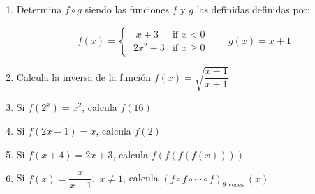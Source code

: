 {\begin{enumerate}[1).-  ]
		 	\begin{multicols}{2}
		 	\begin{enumerate}[a. ]
		 		\item $f(x)=\frac 3 x \; ;\quad g(x)=x^2-1$
		 		\item $f(x)= \frac 1 x\; ; \quad g(x)=\sqrt{x+2}$
		 	\end{enumerate}	
		 	\end{multicols}
			
			\rightline{\textcolor{gris}{Solución: b) $D(f\circ g)=]-2, \infty[; \quad D(g\circ f)=]-\infty, -1/2] \cup ]0, \infty[$  }}

		 \item Determina $f\circ g$ siendo las funciones $f$ y $g$ las definidas definidas por: 
		 
		 	\begin{equation*}
			f(x)=
			\begin{cases} 
			\;\;  x+3 &\mbox{if } x<0 \\ 
			\; 2x^2+3 & \mbox{if } x\ge 0 
			\end{cases}
			\qquad g(x)=x+1
			\end{equation*}
		 
		 \item Calcula la inversa de la función $f(x)=\sqrt{\dfrac{x-1}{x+1}}$
		

		

		
		\item Si $f(2^x)=x^2$, calcula $f(16)$
		 
		\rightline{\textcolor{gris}{Solución: 16}}
		
		
		
		\item Si $f(2x-1)=x$, calcula $f(2)$
		 
		\rightline{\textcolor{gris}{Solución: $3/2$}}
		
		
		
		\item Si $f(x+4)=2x+3$, calcula $f(f(f(f(x))))$
		 
		\rightline{\textcolor{gris}{Solución: $3x-155$}}
		
		
		
		\item Si $f(x)=\dfrac {x}{x-1}, \; x\neq 1$, calcula $(f\circ f \circ \cdots \circ f)_{9\mbox{ veces }}(x)$
		 

\end{enumerate}}
